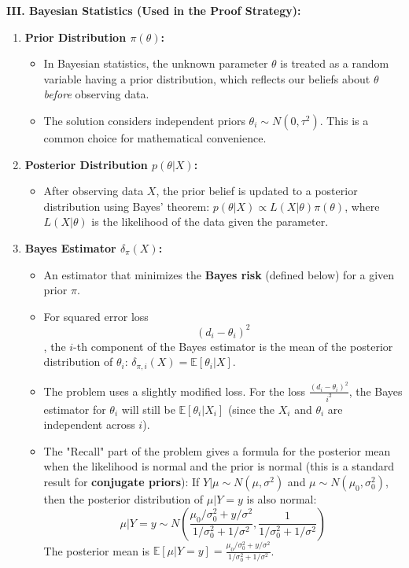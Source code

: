 \textbf{III. Bayesian Statistics (Used in the Proof Strategy):}

\begin{enumerate}
	\item \textbf{Prior Distribution $\pi(\theta)$:}
	\begin{itemize}
		\item In Bayesian statistics, the unknown parameter $\theta$ is treated as a random variable having a prior distribution, which reflects our beliefs about $\theta$ \textit{before} observing data.
		\item The solution considers independent priors $\theta_i \sim N(0, \tau^2)$. This is a common choice for mathematical convenience.
	\end{itemize}
	\item \textbf{Posterior Distribution $p(\theta|X)$:}
	\begin{itemize}
		\item After observing data $X$, the prior belief is updated to a posterior distribution using Bayes' theorem: $p(\theta|X) \propto L(X|\theta) \pi(\theta)$, where $L(X|\theta)$ is the likelihood of the data given the parameter.
	\end{itemize}
	\item \textbf{Bayes Estimator $\delta_\pi(X)$:}
	\begin{itemize}
		\item An estimator that minimizes the \textbf{Bayes risk} (defined below) for a given prior $\pi$.
		\item For squared error loss \[
(d_i - \theta_i)^2
\], the $i$-th component of the Bayes estimator is the mean of the posterior distribution of $\theta_i$: $\delta_{\pi,i}(X) = \mathbb{E}[\theta_i | X]$.
		\item The problem uses a slightly modified loss. For the loss $\frac{(d_i - \theta_i)^2}{i^2}$, the Bayes estimator for $\theta_i$ will still be $\mathbb{E}[\theta_i | X_i]$ (since the $X_i$ and $\theta_i$ are independent across $i$).
		\item The "Recall" part of the problem gives a formula for the posterior mean when the likelihood is normal and the prior is normal (this is a standard result for \textbf{conjugate priors}):
If $Y | \mu \sim N(\mu, \sigma^2)$ and $\mu \sim N(\mu_0, \sigma_0^2)$, then the posterior distribution of $\mu | Y=y$ is also normal:
\[
\mu | Y=y \sim N\left(\frac{\mu_0/\sigma_0^2 + y/\sigma^2}{1/\sigma_0^2 + 1/\sigma^2}, \frac{1}{1/\sigma_0^2 + 1/\sigma^2}\right)
\]The posterior mean is $\mathbb{E}[\mu|Y=y] = \frac{\mu_0/\sigma_0^2 + y/\sigma^2}{1/\sigma_0^2 + 1/\sigma^2}$.

\end{itemize}
\end{enumerate}
